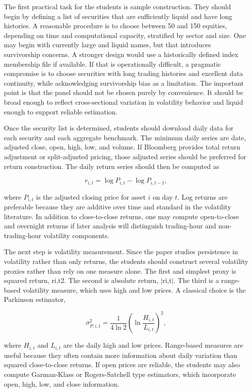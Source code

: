 \documentclass[12pt]{article}
\begin{document}
The first practical task for the students is sample construction. They should begin by defining a list of securities that are sufficiently liquid and have long histories. A reasonable procedure is to choose between 50 and 150 equities, depending on time and computational capacity, stratified by sector and size. One may begin with currently large and liquid names, but that introduces survivorship concerns. A stronger design would use a historically defined index membership file if available. If that is operationally difficult, a pragmatic compromise is to choose securities with long trading histories and excellent data continuity, while acknowledging survivorship bias as a limitation. The important point is that the panel should not be chosen purely by convenience. It should be broad enough to reflect cross-sectional variation in volatility behavior and liquid enough to support reliable estimation.

Once the security list is determined, students should download daily data for each security and each aggregate benchmark. The minimum daily series are date, adjusted close, open, high, low, and volume. If Bloomberg provides total return adjustment or split-adjusted pricing, those adjusted series should be preferred for return construction. The daily return series should then be computed as

\[r_{i,t} = \log P_{i,t} - \log P_{i,t-1},\]

where $P_{i,t}$ is the adjusted closing price for asset $i$ on day $t$. Log returns are preferable because they are additive over time and standard in the volatility literature. In addition to close-to-close returns, one may compute open-to-close and overnight returns if later analysis will distinguish trading-hour and non-trading-hour volatility components.

The next step is volatility measurement. Since the paper studies persistence in volatility rather than only returns, the students should construct several volatility proxies rather than rely on one measure alone. The first and simplest proxy is squared return, ri,t2. The second is absolute return, $|$ri,t$|$. The third is a range-based volatility measure, which uses high and low prices. A classical choice is the Parkinson estimator,

\[\sigma_{P,i,t}^2 = \frac{1}{4\ln 2}\left(\ln\frac{H_{i,t}}{L_{i,t}}\right)^2,\]

where $H_{i,t}$ and $L_{i,t}$ are the daily high and low prices. Range-based measures are useful because they often contain more information about daily variation than squared close-to-close returns. If open prices are reliable, the students may also compute Garman-Klass or Rogers-Satchell type estimators, which incorporate open, high, low, and close information.
\end{document}
